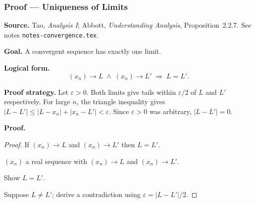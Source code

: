 
\clearpage
{}
\hypertarget{proof-RA-TAO-P-limit-unique}{}

\subsubsection[Uniqueness of Limits]{Proof --- Uniqueness of Limits}

\bigskip

\noindent
\textbf{Source.}
Tao, \emph{Analysis I}; Abbott, \emph{Understanding Analysis}, Proposition~2.2.7.
See notes \texttt{notes-convergence.tex}.

\vspace{0.75em}

\noindent
\textbf{Goal.}
A convergent sequence has exactly one limit.

\vspace{0.75em}

\noindent
\textbf{Logical form.}
\[
  (x_n) \to L \;\wedge\; (x_n) \to L'
  \;\Rightarrow\; L = L'.
\]

\vspace{0.75em}

\noindent
\textbf{Proof strategy.}
Let $\varepsilon > 0$. Both limits give tails within $\varepsilon/2$ of $L$ and $L'$
respectively. For large $n$, the triangle inequality gives
$|L - L'| \le |L - x_n| + |x_n - L'| < \varepsilon$.
Since $\varepsilon > 0$ was arbitrary, $|L - L'| = 0$.

\vspace{0.75em}

\noindent
\textbf{Proof.}
\begin{proof}
\Claim If $(x_n) \to L$ and $(x_n) \to L'$ then $L = L'$.

\Given $(x_n)$ a real sequence with $(x_n) \to L$ and $(x_n) \to L'$.

\Goal Show $L = L'$.

\Strategy Suppose $L \ne L'$; derive a contradiction using $\varepsilon = |L - L'|/2$.

\medskip






\end{proof}

